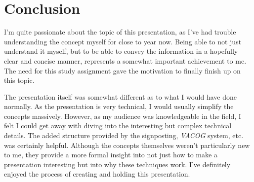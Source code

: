 \chapter{Conclusion}



I'm quite passionate about the topic of this presentation, as I've had trouble understanding the concept myself for close to year now.
Being able to not just understand it myself, but to be able to convey the information in a hopefully clear and concise manner, represents a somewhat important achievement to me.
The need for this study assignment gave the motivation to finally finish up on this topic.

The presentation itself was somewhat different as to what I would have done normally.
As the presentation is very technical, I would usually simplify the concepts massively.
However, as my audience was knowledgeable in the field, I felt I could get away with diving into the interesting but complex technical details.
The added structure provided by the signposting, \textit{VACOG} system, etc. was certainly helpful.
Although the concepts themselves weren't particularly new to me, they provide a more formal insight into not just how to make a presentation interesting but into why these techniques work.
I've definitely enjoyed the process of creating and holding this presentation.

\asterism
